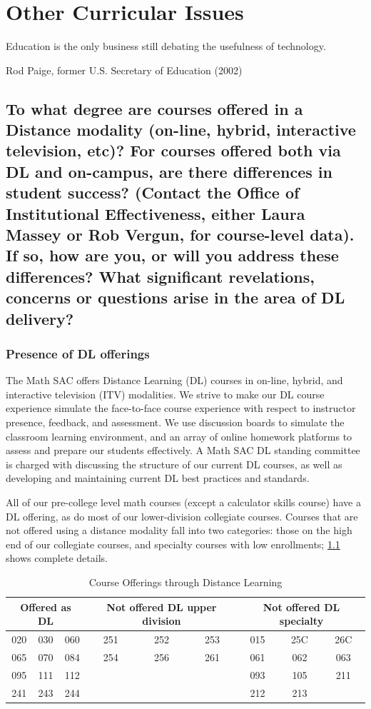 \chapter{Other  Curricular Issues}\label{chap:otherissues}
\epigraph{Education is the only business still debating the usefulness of technology.}{Rod Paige, former U.S. Secretary of Education (2002)}
\section[Distance education]{To what degree are courses offered in a Distance
modality (on-line, hybrid, interactive television, etc)? For courses offered
both via DL and on-campus, are there differences in student success? (Contact
the Office of Institutional Effectiveness, either Laura Massey or Rob Vergun,
for course-level data). If so, how are you, or will you address these
differences? What significant revelations, concerns or questions arise in the
area of DL delivery?}\label{other:sec:distancelearning}

\subsection{Presence of DL offerings}
The Math SAC offers Distance Learning (DL) courses in on-line, hybrid, and
interactive television (ITV) modalities.  We strive to make our DL course
experience simulate the face-to-face course experience with respect to
instructor presence, feedback, and assessment. We use discussion boards to
simulate the classroom learning environment, and an array of online homework
platforms to assess and prepare our students effectively. A Math SAC DL standing
committee is charged with discussing the structure of our current DL courses, as
well as developing and maintaining current DL best practices and standards.

All of our pre-college level math courses (except a calculator skills course)
have a DL offering, as do most of our lower-division collegiate courses.
Courses that are not offered using a distance modality fall into two categories:
those on the high end of our collegiate courses, and specialty courses with low
enrollments; \cref{tab:sec3:DLofferings} shows complete details.

\begin{table}
\caption{Course Offerings through Distance Learning}\label{tab:sec3:DLofferings}
\centering
\begin{tabular}{ccccccccc}
\toprule
\multicolumn{3}{p{1in}}{Offered as DL} & \multicolumn{3}{p{1in}}{Not offered  DL upper division} & \multicolumn{3}{p{1in}}{Not offered  DL specialty}\\
\midrule
020& 030& 060& 		251& 252& 253&		015& 25C& 26C\\
065& 070& 084& 		254& 256& 261&		061& 062& 063\\
095& 111& 112& 		&&&					093& 105& 211\\
241& 243& 244&		&&&					212& 213\\
\bottomrule
\end{tabular}
\end{table}

